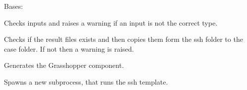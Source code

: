 \documentclass[letterpaper,10pt,english]{sphinxmanual}
\begin{document}
\begin{fulllineitems}
\label{\detokenize{cmf:livestock.components.comp_cmf.CMFSolve}}
Bases: {\hyperref[\detokenize{superclass:livestock.components.component.GHComponent}]{}}

\begin{fulllineitems}
\label{\detokenize{cmf:livestock.components.comp_cmf.CMFSolve.check_inputs}}
Checks inputs and raises a warning if an input is not the correct type.

\end{fulllineitems}


\begin{fulllineitems}
\label{\detokenize{cmf:livestock.components.comp_cmf.CMFSolve.check_results}}
Checks if the result files exists and then copies them form the ssh folder to the case folder.
If not then a warning is raised.

\end{fulllineitems}


\begin{fulllineitems}
\label{\detokenize{cmf:livestock.components.comp_cmf.CMFSolve.config}}
Generates the Grasshopper component.

\end{fulllineitems}


\begin{fulllineitems}
\label{\detokenize{cmf:livestock.components.comp_cmf.CMFSolve.do_case}}
Spawns a new subprocess, that runs the ssh template.

\end{fulllineitems}



\end{fulllineitems}
\end{document}
